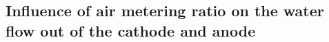 


\par

\subsection{Influence of air metering ratio on the water flow out of the cathode and anode}

